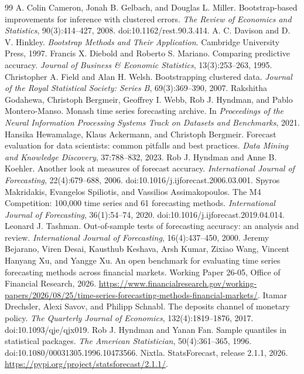 \documentclass[11pt]{article}
\begin{document}
\begin{thebibliography}{99}
 A. Colin Cameron, Jonah B. Gelbach, and Douglas L. Miller. Bootstrap-based improvements for inference with clustered errors. \emph{The Review of Economics and Statistics}, 90(3):414--427, 2008. doi:10.1162/rest.90.3.414.
 A. C. Davison and D. V. Hinkley. \emph{Bootstrap Methods and Their Application}. Cambridge University Press, 1997.
 Francis X. Diebold and Roberto S. Mariano. Comparing predictive accuracy. \emph{Journal of Business \& Economic Statistics}, 13(3):253--263, 1995.
 Christopher A. Field and Alan H. Welsh. Bootstrapping clustered data. \emph{Journal of the Royal Statistical Society: Series B}, 69(3):369--390, 2007.
 Rakshitha Godahewa, Christoph Bergmeir, Geoffrey I. Webb, Rob J. Hyndman, and Pablo Montero-Manso. Monash time series forecasting archive. In \emph{Proceedings of the Neural Information Processing Systems Track on Datasets and Benchmarks}, 2021.
 Hansika Hewamalage, Klaus Ackermann, and Christoph Bergmeir. Forecast evaluation for data scientists: common pitfalls and best practices. \emph{Data Mining and Knowledge Discovery}, 37:788--832, 2023.
 Rob J. Hyndman and Anne B. Koehler. Another look at measures of forecast accuracy. \emph{International Journal of Forecasting}, 22(4):679--688, 2006. doi:10.1016/j.ijforecast.2006.03.001.
 Spyros Makridakis, Evangelos Spiliotis, and Vassilios Assimakopoulos. The M4 Competition: 100,000 time series and 61 forecasting methods. \emph{International Journal of Forecasting}, 36(1):54--74, 2020. doi:10.1016/j.ijforecast.2019.04.014.
 Leonard J. Tashman. Out-of-sample tests of forecasting accuracy: an analysis and review. \emph{International Journal of Forecasting}, 16(4):437--450, 2000.
 Jeremy Bejarano, Viren Desai, Kausthub Keshava, Arsh Kumar, Zixiao Wang, Vincent Hanyang Xu, and Yangge Xu. An open benchmark for evaluating time series forecasting methods across financial markets. Working Paper 26-05, Office of Financial Research, 2026. \url{https://www.financialresearch.gov/working-papers/2026/08/25/time-series-forecasting-methods-financial-markets/}.
 Itamar Drechsler, Alexi Savov, and Philipp Schnabl. The deposits channel of monetary policy. \emph{The Quarterly Journal of Economics}, 132(4):1819--1876, 2017. doi:10.1093/qje/qjx019.
 Rob J. Hyndman and Yanan Fan. Sample quantiles in statistical packages. \emph{The American Statistician}, 50(4):361--365, 1996. doi:10.1080/00031305.1996.10473566.
 Nixtla. StatsForecast, release 2.1.1, 2026. \url{https://pypi.org/project/statsforecast/2.1.1/}.
\end{thebibliography}
\end{document}
